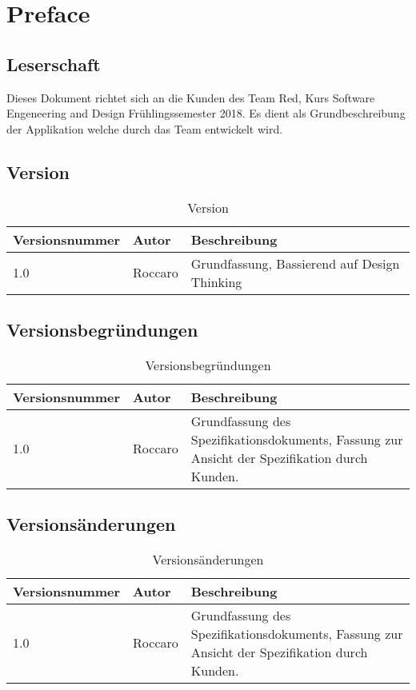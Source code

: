 \chapter{Preface}
\section{Leserschaft}

Dieses Dokument richtet sich an die Kunden des Team Red, Kurs Software
Engeneering and Design Fr\"{u}hlingssemester 2018. Es dient als
Grundbeschreibung der Applikation welche durch das Team entwickelt wird.

\section{Version}

\begin{table}[h]
 \caption{Version}
 \begin{tabularx}{\textwidth}{|l|l|X|}
     \hline
     \textbf{Versionsnummer}  & \textbf{Autor}  & \textbf{Beschreibung} \\
     \hline
     1.0                      & Roccaro         & Grundfassung, Bassierend auf Design Thinking \\
     \hline
 \end{tabularx}
 \label{table: Version}
\end{table}

\section{Versionsbegr\"{u}ndungen}

\begin{table}[h]
 \caption{Versionsbegr\"{u}ndungen}
 \begin{tabularx}{\linewidth}{|l|l|X|}
     \hline
     \textbf{Versionsnummer}  & \textbf{Autor}  & \textbf{Beschreibung} \\
     \hline
     1.0                      & Roccaro         & Grundfassung des
     Spezifikationsdokuments, Fassung zur Ansicht der Spezifikation durch Kunden. \\
     \hline
 \end{tabularx}
 \label{table: Versionsbegr\"{u}ndungen}
\end{table}

\section{Versions\"{a}nderungen}

\begin{table}[h]
 \caption{Versions\"{a}nderungen}
 \begin{tabularx}{\textwidth}{|l|l|X|}
     \hline
     \textbf{Versionsnummer}  & \textbf{Autor}  & \textbf{Beschreibung} \\
     \hline
     1.0                      & Roccaro         & Grundfassung des
     Spezifikationsdokuments, Fassung zur Ansicht der Spezifikation durch Kunden. \\
     \hline
 \end{tabularx}
 \label{table: Versions\"{a}nderungen}
\end{table}
